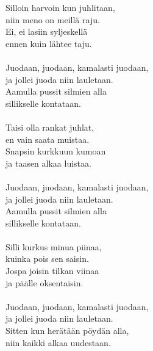 
Silloin harvoin kun juhlitaan, \\ niin meno on meillä raju. \\ Ei, ei lasiin syljeskellä \\ ennen kuin lähtee taju. \\ \hspace{10mm} \\ Juodaan, juodaan, kamalasti juodaan, \\ ja jollei juoda niin lauletaan. \\ Aamulla pussit silmien alla \\ sillikselle kontataan. \\ \hspace{10mm} \\ Taisi olla rankat juhlat, \\ en vain saata muistaa. \\ Snapsin kurkkuun kumoan \\ ja taasen alkaa luistaa. \\ \hspace{10mm} \\ Juodaan, juodaan, kamalasti juodaan, \\ ja jollei juoda niin lauletaan. \\ Aamulla pussit silmien alla \\ sillikselle kontataan. \\ \hspace{10mm} \\ Silli kurkus minua piinaa, \\ kuinka pois sen saisin. \\ Jospa joisin tilkan viinaa \\ ja päälle oksentaisin. \\ \hspace{10mm} \\ Juodaan, juodaan, kamalasti juodaan, \\ ja jollei juoda niin lauletaan. \\ Sitten kun herätään pöydän alla, \\ niin kaikki alkaa uudestaan.
